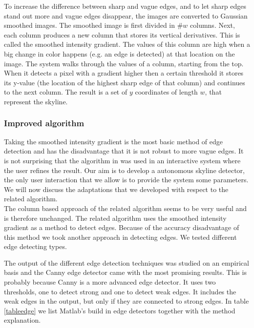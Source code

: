 To increase the difference between sharp and vague edges, and to let sharp edges
stand out more and vague edges disappear, the images are converted to Gaussian
smoothed images.  The smoothed image is first divided in \#$w$ columns.  Next,
each column produces a new column that stores its vertical derivatives. This is
called the smoothed intensity gradient.  The values of this column are high when
a big change in color happens (e.g. an edge is detected) at that location on the
image. 
The system walks through the values of a column, starting from the top.  When it
detects a pixel with a gradient higher then a certain threshold it stores its
y-value (the location of the highest sharp edge of that column) and continues
to the next column.  The result is a set of $y$ coordinates of length $w$, that
represent the skyline. 

\subsubsection{Improved algorithm}
Taking the smoothed intensity gradient is the most basic method of edge
detection and has the disadvantage that it is not robust to more vague edges. It
is not surprising that the algorithm in \cite{Rover}
was used in an interactive system where the user refines the result. 
Our aim is to develop a autonomous skyline detector, the only user interaction
that we allow is to provide the system some parameters. We will now discuss
the adaptations that we developed with respect to the related algorithm.\\

The column based approach of the related algorithm seems to be very useful and is
therefore unchanged.  The related algorithm uses the smoothed intensity gradient
as a method to detect edges. 
Because of the accuracy disadvantage of this method we took another approach in
detecting edges. We tested different edge detecting types. 

The output of the different edge detection techniques was studied on an empirical
basis and the Canny edge detector came with the most promising results. This is
probably because Canny is a more advanced edge detector.  It uses two
thresholds, one to detect strong and one to detect weak edges. It includes the weak edges in the
output, but only if they are connected to strong edges. In table \ref{tableedge} %
we list Matlab's build in edge detectors together with the method explanation.

